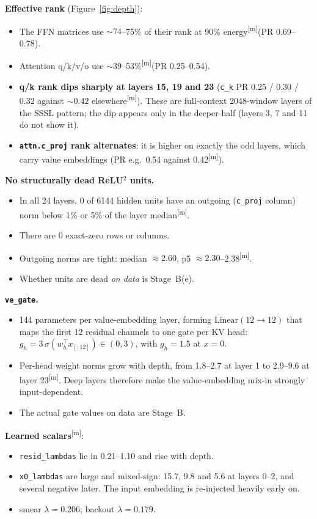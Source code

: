 \documentclass[11pt]{article}
\newcommand{\meas}{\textsuperscript{[m]}}   %
\begin{document}
\textbf{Effective rank} (Figure~\ref{fig:depth}):
\begin{itemize}
\item The FFN matrices use ${\sim}74$--75\% of their rank at 90\% energy\meas (PR 0.69--0.78).
\item Attention q/k/v/o use ${\sim}39$--53\%\meas (PR 0.25--0.54).
\item \textbf{q/k rank dips sharply at layers 15, 19 and 23} (\texttt{c\_k} PR 0.25 / 0.30 / 0.32 against ${\sim}0.42$ elsewhere\meas). These are full-context 2048-window layers of the SSSL pattern; the dip appears only in the deeper half (layers 3, 7 and 11 do not show it).
\item \textbf{\texttt{attn.c\_proj} rank alternates}: it is higher on exactly the odd layers, which carry value embeddings (PR e.g.\ 0.54 against 0.42\meas).
\end{itemize}

\textbf{No structurally dead ReLU$^2$ units.}
\begin{itemize}
\item In all 24 layers, 0 of 6144 hidden units have an outgoing (\texttt{c\_proj} column) norm below 1\% or 5\% of the layer median\meas.
\item There are 0 exact-zero rows or columns.
\item Outgoing norms are tight: median ${\approx}2.60$, p5 ${\approx}2.30$--2.38\meas.
\item Whether units are dead \emph{on data} is Stage~B(e).
\end{itemize}

\textbf{\texttt{ve\_gate}.}
\begin{itemize}
\item 144 parameters per value-embedding layer, forming $\text{Linear}(12\to 12)$ that maps the first 12 residual channels to one gate per KV head: $g_h = 3\,\sigma(w_h^\top x_{[:12]})\in(0,3)$, with $g_h=1.5$ at $x=0$.
\item Per-head weight norms grow with depth, from 1.8--2.7 at layer 1 to 2.9--9.6 at layer 23\meas. Deep layers therefore make the value-embedding mix-in strongly input-dependent.
\item The actual gate values on data are Stage~B.
\end{itemize}

\textbf{Learned scalars}\meas:
\begin{itemize}
\item \texttt{resid\_lambdas} lie in 0.21--1.10 and rise with depth.
\item \texttt{x0\_lambdas} are large and mixed-sign: 15.7, 9.8 and 5.6 at layers 0--2, and several negative later. The input embedding is re-injected heavily early on.
\item smear $\lambda=0.206$; backout $\lambda=0.179$.
\end{itemize}
\end{document}
